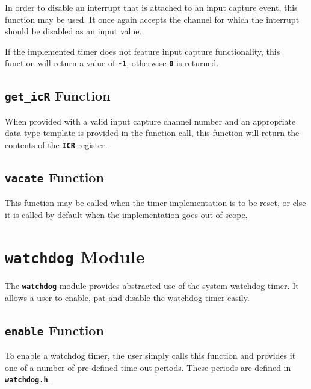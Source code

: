 \documentclass[a4paper, oneside, 11pt, titlepage, onecolumn, openright]{report}
\begin{document}
					In order to disable an interrupt that is attached to an input capture event, this function may be used. It once again accepts the channel for which the interrupt should be disabled as an input value.
 			
 If the implemented timer does not feature input capture functionality, this function will return a value of \textbf{\texttt{-1}}, otherwise \textbf{\texttt{0}} is returned.
			
				\subsection{\textbf{\texttt{get\_icR}} Function}
					\label{ss:Hardware Abstraction Libraries:tc Module:get_icR_interrupt Function}
			
					When provided with a valid input capture channel number and an appropriate data type template is provided in the function call, this function will return the contents of the \textbf{\texttt{ICR}} register.	
			
				\subsection{\textbf{\texttt{vacate}} Function}
					\label{ss:Hardware Abstraction Libraries:tc Module:vacate Function}
			
					This function may be called when the timer implementation is to be reset, or else it is called by default when the implementation goes out of scope.
			
			\section{\textbf{\texttt{watchdog}} Module}
				\label{s:Hardware Abstraction Libraries:watchdog Module}
			
				The \textbf{\texttt{watchdog}} module provides abstracted use of the system watchdog timer. It allows a user to enable, pat and disable the watchdog timer easily.

				\subsection{\textbf{\texttt{enable}} Function}
					\label{ss:Hardware Abstraction Libraries:watchdog Module:enable Function}
			
					To enable a watchdog timer, the user simply calls this function and provides it one of a number of pre-defined time out periods. These periods are defined in \textbf{\texttt{watchdog.h}}.
						
\end{document}
